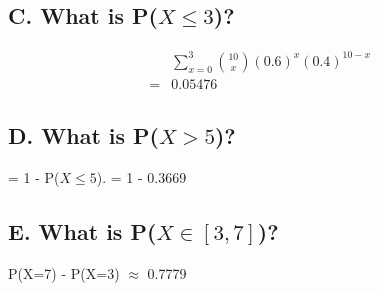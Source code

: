 \documentclass[]{article}
\begin{document}
		\subsection{C. What is P($X \leq 3$)?}
			\begin{align*}
				 &\sum_{x=0}^{3}\binom{10}{x}(0.6)^x(0.4)^{10-x} \\
				=& 0.05476
			\end{align*}
		\subsection{D. What is P($X > 5$)?}
			= 1 - P($X \leq 5$).
			= 1 - 0.3669
		\subsection{E. What is P($X \in [3, 7]$)?}
			P(X=7) - P(X=3) $\approx$ 0.7779
\end{document}
